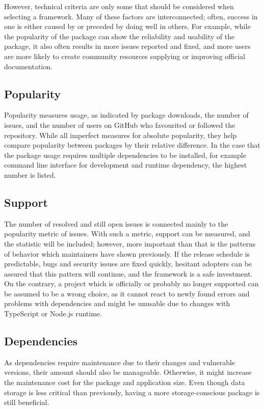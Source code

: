 However, technical criteria are only some that should be considered when
selecting a framework. Many of these factors are interconnected; often, success
in one is either caused by or preceded by doing well in others. For example,
while the popularity of the package can show the reliability and usability of
the package, it also often results in more issues reported and fixed, and more
users are more likely to create community resources supplying or improving
official documentation.

\subsection{Popularity}

Popularity measures usage, as indicated by package downloads, the number of
issues, and the number of users on GitHub who favourited or followed the
repository. While all imperfect measures for absolute popularity, they help
compare popularity between packages by their relative difference. In the case
that the package usage requires multiple dependencies to be installed, for
example command line interface for development and runtime dependency, the
highest number is listed.

\subsection{Support}

The number of resolved and still open issues is connected mainly to the
popularity metric of issues. With such a metric, support can be measured, and
the statistic will be included; however, more important than that is the
patterns of behavior which maintainers have shown previously. If the release
schedule is predictable, bugs and security issues are fixed quickly, hesitant
adopters can be assured that this pattern will continue, and the framework is a
safe investment. On the contrary, a project which is officially or probably no
longer supported can be assumed to be a wrong choice, as it cannot react to
newly found errors and problems with dependencies and might be unusable due to
changes with TypeScript or Node.js runtime.

\subsection{Dependencies}

As dependencies require maintenance due to their changes and vulnerable
versions, their amount should also be manageable. Otherwise, it might increase
the maintenance cost for the package and application size. Even though data
storage is less critical than previously, having a more storage-conscious
package is still beneficial.

